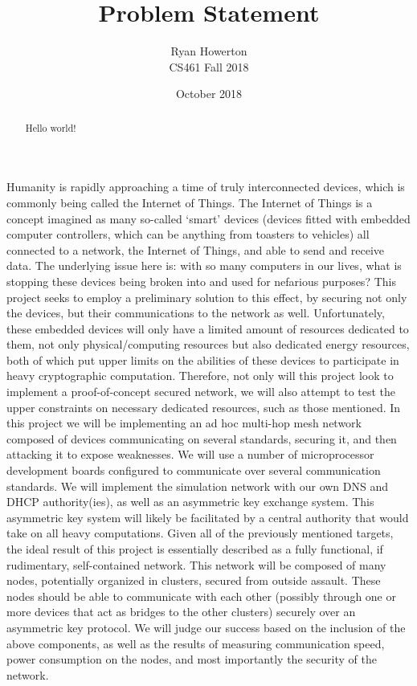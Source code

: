 \documentclass[10pt,draftclsnofoot,onecolumn]{IEEEtran}
\title{Problem Statement}
\author{Ryan Howerton \\ CS461 Fall 2018}
\date{October 2018}
\begin{document}
	\maketitle
	\begin{abstract}
    Hello world!
    \end{abstract}
    \newpage
    Humanity is rapidly approaching a time of truly interconnected devices, which is commonly being called the Internet of Things. The Internet of Things is a concept imagined as many so-called ‘smart’ devices (devices fitted with embedded computer controllers, which can be anything from toasters to vehicles) all connected to a network, the Internet of Things, and able to send and receive data. The underlying issue here is: with so many computers in our lives, what is stopping these devices being broken into and used for nefarious purposes? This project seeks to employ a preliminary solution to this effect, by securing not only the devices, but their communications to the network as well.\vspace{\baselineskip}
    Unfortunately, these embedded devices will only have a limited amount of resources dedicated to them, not only physical/computing resources but also dedicated energy resources, both of which put upper limits on the abilities of these devices to participate in heavy cryptographic computation. Therefore, not only will this project look to implement a proof-of-concept secured network, we will also attempt to test the upper constraints on necessary dedicated resources, such as those mentioned.\vspace{\baselineskip}
    In this project we will be implementing an ad hoc multi-hop mesh network composed of devices communicating on several standards, securing it, and then attacking it to expose weaknesses. We will use a number of microprocessor development boards configured to communicate over several communication standards. We will implement the simulation network with our own DNS and DHCP authority(ies), as well as an asymmetric key exchange system. This asymmetric key system will likely be facilitated by a central authority that would take on all heavy computations.\vspace{\baselineskip}
    Given all of the previously mentioned targets, the ideal result of this project is essentially described as a fully functional, if rudimentary, self-contained network. This network will be composed of many nodes, potentially organized in clusters, secured from outside assault. These nodes should be able to communicate with each other (possibly through one or more devices that act as bridges to the other clusters) securely over an asymmetric key protocol. We will judge our success based on the inclusion of the above components, as well as the results of measuring communication speed, power consumption on the nodes, and most importantly the security of the network.
\end{document}
